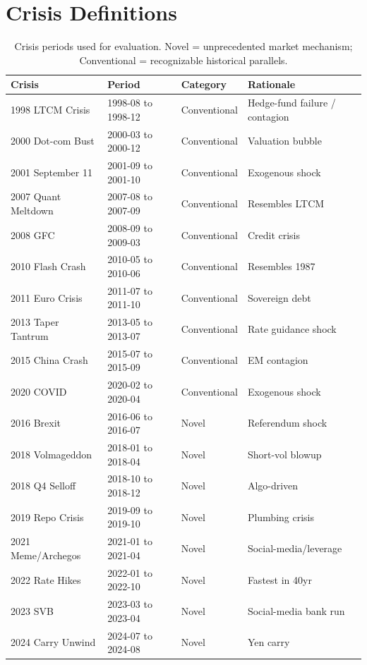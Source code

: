 \documentclass[3p]{elsarticle}
\begin{document}
\section{Crisis Definitions}\label{sec:crisis_definitions}

\begin{table}[htb]
\centering
\caption{Crisis periods used for evaluation.  Novel = unprecedented
  market mechanism; Conventional = recognizable historical parallels.}
\label{tab:crises}
\small
\begin{tabular}{llll}
\toprule
Crisis & Period & Category & Rationale \\
\midrule
1998 LTCM Crisis      & 1998-08 to 1998-12 & Conventional & Hedge-fund failure / contagion \\
2000 Dot-com Bust     & 2000-03 to 2000-12 & Conventional & Valuation bubble \\
2001 September 11     & 2001-09 to 2001-10 & Conventional & Exogenous shock \\
2007 Quant Meltdown   & 2007-08 to 2007-09 & Conventional & Resembles LTCM \\
2008 GFC              & 2008-09 to 2009-03 & Conventional & Credit crisis \\
2010 Flash Crash      & 2010-05 to 2010-06 & Conventional & Resembles 1987 \\
2011 Euro Crisis      & 2011-07 to 2011-10 & Conventional & Sovereign debt \\
2013 Taper Tantrum    & 2013-05 to 2013-07 & Conventional & Rate guidance shock \\
2015 China Crash      & 2015-07 to 2015-09 & Conventional & EM contagion \\
2020 COVID            & 2020-02 to 2020-04 & Conventional & Exogenous shock \\
\midrule
2016 Brexit           & 2016-06 to 2016-07 & Novel & Referendum shock \\
2018 Volmageddon      & 2018-01 to 2018-04 & Novel & Short-vol blowup \\
2018 Q4 Selloff       & 2018-10 to 2018-12 & Novel & Algo-driven \\
2019 Repo Crisis      & 2019-09 to 2019-10 & Novel & Plumbing crisis \\
2021 Meme/Archegos    & 2021-01 to 2021-04 & Novel & Social-media/leverage \\
2022 Rate Hikes       & 2022-01 to 2022-10 & Novel & Fastest in 40yr \\
2023 SVB              & 2023-03 to 2023-04 & Novel & Social-media bank run \\
2024 Carry Unwind     & 2024-07 to 2024-08 & Novel & Yen carry \\
\bottomrule
\end{tabular}
\end{table}
\end{document}
